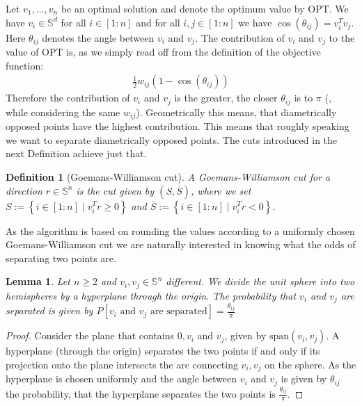 \documentclass[12pt,a4paper]{article}
\theoremstyle{mythm}
\newtheorem{Def}[thm]{Definition}
\newtheorem{lem}[thm]{Lemma}
\begin{document}
Let $ v_1 , \dots , v_n $ be an optimal solution and denote the optimum value by OPT.
We have $ v_i \in \mathbb{S} ^{ d }  $ for all $ i \in \left[ 1:n \right]  $ and 
for all $ i,j \in \left[ 1:n \right]  $ we have $ \cos( \theta _{ ij }  ) = v_i ^T v_j $. 
Here $ \theta _{ ij }  $ denotes the angle between $ v_i $ and $ v_j $.
The contribution of $ v_i $ and $ v_j $ to the value of OPT is, as we simply read off from the definition of the objective function:
\begin{align*}
\frac{ 1 }{ 2 } w _{ ij } \left( 1 - \cos( \theta _{ ij }  )  \right) 
\end{align*} 
Therefore the contribution of $ v_i $ and $ v_j $ is the greater, the closer $ \theta _{ ij }  $ is to $ \pi  $ (, while considering the same $ w _{ ij }  $). 
Geometrically this means, that diametrically opposed points have the highest contribution.
This means that roughly speaking we want to separate diametrically opposed points.
The cuts introduced in the next Definition achieve just that.
\begin{Def}[Goemans-Williamson cut] 
A Goemans-Williamson cut for a direction $ r \in \mathbb{S} ^{ n }  $ is the cut given by 
$ \left( S , \overline{ S }  \right)  $, where we set $ S := \left\{ i \in \left[ 1:n \right]  \mid  v_i ^T r \geq 0  \right\}  $ and 
$ \overline{ S }  := \left\{ i \in \left[ 1:n \right] \mid  v_i ^T r < 0  \right\} $.
\end{Def} 
As the algorithm is based on rounding the values according to a uniformly chosen Goemans-Williamson cut we are naturally interested in knowing what the odds of separating
two points are.
\begin{lem}
\label{lem:angle} 
Let $ n \geq 2  $ and $ v_i , v_j \in \mathbb{S} ^{ n } $ different. We divide the unit sphere into two hemispheres by a hyperplane through the origin.
The probability that $ v_i $ and $ v_j $ are separated is given by $ P \left[ v_i \text{ and } v_j \text{ are separated}  \right] = \frac{ \theta _{ ij }  }{ \pi }   $
\end{lem} 
\begin{proof}
Consider the plane that contains $ 0,v_i $ and $ v_j $, given by $ \text{span} \left( v_i, v_j \right) $.
A hyperplane (through the origin) separates the two points if and only if its projection onto the plane intersects the arc connecting $ v_i, v_j $ on the sphere.
As the hyperplane is chosen uniformly and the angle between $ v_i $ and $ v_j $ is given by $ \theta _{ ij }  $ the probability, that the hyperplane separates the two points is $ \frac{ \theta _{ ij }  }{ \pi }  $.
\end{proof}
\end{document}
